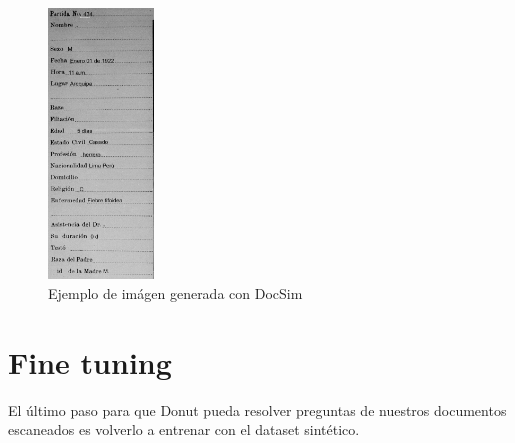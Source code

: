 \documentclass[../main.tex]{subfiles}
\begin{document}
\begin{figure}[H]
	\centering
	\includegraphics[width=0.25\textwidth]{006cc6cd159e46b5bf3c44c9545fbb25.jpg}
	\caption{Ejemplo de imágen generada con DocSim}
\end{figure}


\section{Fine tuning}

El último paso para que Donut pueda resolver preguntas de nuestros documentos escaneados es volverlo a entrenar con el dataset sintético.

\inputminted[bgcolor=codeBack, tabsize=2]{bash}{train-es-finetuned.sh}
\end{document}
